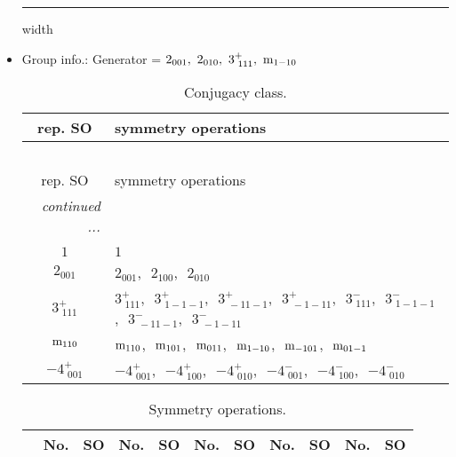 \documentclass[fleqn,10pt,landscape]{article}
\begin{document}
\begin{itemize}
 \hfil \hrule height 1mm width \textwidth \hfil

\item Group info.: Generator = $2{}_{001},\,\,2{}_{010},\,\,3^{+}_{\,\,111},\,\,{\rm m}_{1-10}$

\begin{center}
\renewcommand{\arraystretch}{1.3}
\begin{longtable}{c|l}
\caption{Conjugacy class.}
 \\
 \hline \hline
rep. SO & symmetry operations \\ \hline \endfirsthead

\multicolumn{1}{l}{\tablename\ \thetable{}} \\
 \hline \hline
rep. SO & symmetry operations \\ \hline \endhead

 \hline \hline
\multicolumn{1}{r}{\footnotesize\it continued ...} \\ \endfoot

 \hline \hline
\multicolumn{1}{r}{} \\ \endlastfoot

$1$ & $1$ \\ \hline
$2{}_{001}$ & $2{}_{001}$,\,\, $2{}_{100}$,\,\, $2{}_{010}$ \\ \hline
$3^{+}_{\,\,111}$ & $3^{+}_{\,\,111}$,\,\, $3^{+}_{\,\,1-1-1}$,\,\, $3^{+}_{\,\,-11-1}$,\,\, $3^{+}_{\,\,-1-11}$,\,\, $3^{-}_{\,\,111}$,\,\, $3^{-}_{\,\,1-1-1}$,\,\, $3^{-}_{\,\,-11-1}$,\,\, $3^{-}_{\,\,-1-11}$ \\ \hline
${\rm m}_{110}$ & ${\rm m}_{110}$,\,\, ${\rm m}_{101}$,\,\, ${\rm m}_{011}$,\,\, ${\rm m}_{1-10}$,\,\, ${\rm m}_{-101}$,\,\, ${\rm m}_{01-1}$ \\ \hline
$-4^{+}_{\,\,001}$ & $-4^{+}_{\,\,001}$,\,\, $-4^{+}_{\,\,100}$,\,\, $-4^{+}_{\,\,010}$,\,\, $-4^{-}_{\,\,001}$,\,\, $-4^{-}_{\,\,100}$,\,\, $-4^{-}_{\,\,010}$ \\
\end{longtable}
\end{center}
\begin{center}
\renewcommand{\arraystretch}{1.3}
\begin{longtable}{c|cc|cc|cc|cc|cc}
\caption{Symmetry operations.}
 \\
 \hline \hline
 & No. & SO & No. & SO & No. & SO & No. & SO & No. & SO \\ \hline \endfirsthead


\end{longtable}
\end{center}
\end{itemize}
\end{document}
